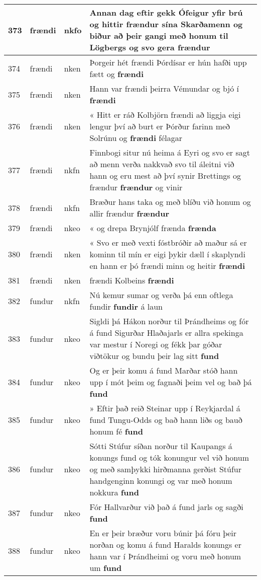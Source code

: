 \documentclass{article}
\begin{document}
\begin{longtable}{p{1cm}|p{1cm}|p{1cm}|p{13cm}}
\hline
373&frændi&nkfo&Annan dag eftir gekk Ófeigur yfir brú og hittir frændur sína Skarðamenn og biður að þeir gangi með honum til Lögbergs og svo gera \textbf{frændur} \\
\hline
374&frændi&nken&Þorgeir hét frændi Þórdísar er hún hafði upp fætt og \textbf{frændi} \\
\hline
375&frændi&nken&Hann var frændi þeirra Vémundar og bjó í \textbf{frændi} \\
\hline
376&frændi&nken&« Hitt er ráð Kolbjörn frændi að liggja eigi lengur því að burt er Þórður farinn með Solrúnu og \textbf{frændi} félagar\\
\hline
377&frændi&nkfn&Finnbogi situr nú heima á Eyri og svo er sagt að menn verða nakkvað svo til áleitni við hann og eru mest að því synir Brettings og frændur \textbf{frændur} og vinir\\
\hline
378&frændi&nkfn&Bræður hans taka og með blíðu við honum og allir frændur \textbf{frændur} \\
\hline
379&frændi&nkeo&« og drepa Brynjólf frænda \textbf{frænda} \\
\hline
380&frændi&nken&« Svo er með vexti fóstbróðir að maður sá er kominn til mín er eigi þykir dæll í skaplyndi en hann er þó frændi minn og heitir \textbf{frændi} \\
\hline
381&frændi&nken&frændi Kolbeins \textbf{frændi} \\
\hline
382&fundur&nkfn&Nú kemur sumar og verða þá enn oftlega fundir \textbf{fundir} á laun\\
\hline
383&fundur&nkeo&Sigldi þá Hákon norður til Þrándheims og fór á fund Sigurðar Hlaðajarls er allra spekinga var mestur í Noregi og fékk þar góðar viðtökur og bundu þeir lag sitt \textbf{fund} \\
\hline
384&fundur&nkeo&Og er þeir komu á fund Marðar stóð hann upp í mót þeim og fagnaði þeim vel og bað þá \textbf{fund} \\
\hline
385&fundur&nkeo&» Eftir það reið Steinar upp í Reykjardal á fund Tungu-Odds og bað hann liðs og bauð honum fé \textbf{fund} \\
\hline
386&fundur&nkeo&Sótti Stúfur síðan norður til Kaupangs á konungs fund og tók konungur vel við honum og með samþykki hirðmanna gerðist Stúfur handgenginn konungi og var með honum nokkura \textbf{fund} \\
\hline
387&fundur&nkeo&Fór Hallvarður við það á fund jarls og sagði \textbf{fund} \\
\hline
388&fundur&nkeo&En er þeir bræður voru búnir þá fóru þeir norðan og komu á fund Haralds konungs er hann var í Þrándheimi og voru með honum um \textbf{fund} \\

\end{longtable}
\end{document}
